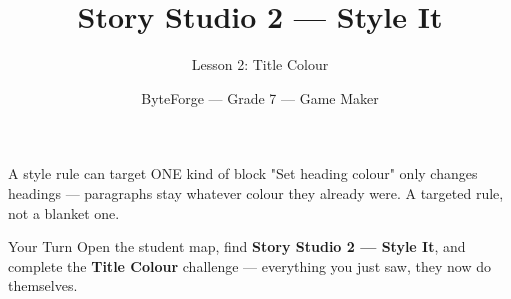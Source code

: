 \documentclass[aspectratio=169]{beamer}
\title{Story Studio 2 — Style It}
\subtitle{Lesson 2: Title Colour}
\author{ByteForge --- Grade 7 --- Game Maker}
\date{}
\begin{document}
\begin{frame}
    \titlepage
\end{frame}

\begin{frame}{A style rule can target ONE kind of block}
    \Large
    "Set heading colour" only changes headings — paragraphs stay whatever colour they already were. A targeted rule, not a blanket one.
\end{frame}

\begin{frame}{Your Turn}
    \Large
    Open the student map, find \textbf{Story Studio 2 — Style It}, and complete
    the \textbf{Title Colour} challenge --- everything you just saw, they now do themselves.
\end{frame}
\end{document}
